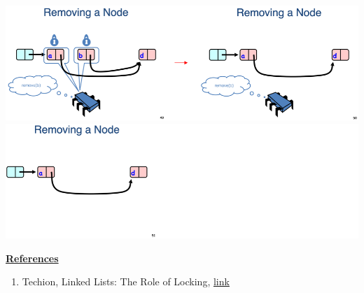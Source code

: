 \documentclass[12pt]{article}
\begin{document}
\begin{enumerate}[1.]
\begin{enumerate}[a)]
\begin{itemize}
\begin{itemize}
\begin{center}
                \includegraphics[width=\linewidth]{../images/midterm_3_solution_8.png}
                \includegraphics[width=\linewidth]{../images/midterm_3_solution_9.png}
                \end{center}

            \end{itemize}
        \end{itemize}

        \bigskip

        \underline{\textbf{References}}

        \begin{enumerate}[1)]
            \item Techion, Linked Lists: The Role of Locking, \href{http://www.cs.technion.ac.il/~erez/courses/seminar/talks/05.pdf}{link}
        \end{enumerate}

    \end{enumerate}


\end{enumerate}
\end{document}
